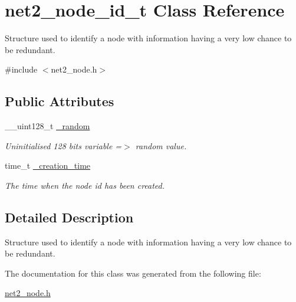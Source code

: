 \hypertarget{structnet2__node__id__t}{\section{net2\-\_\-node\-\_\-id\-\_\-t Class Reference}
\label{structnet2__node__id__t}
}


Structure used to identify a node with information having a very low chance to be redundant.  




{\ttfamily \#include $<$net2\-\_\-node.\-h$>$}

\subsection*{Public Attributes}
\begin{DoxyCompactItemize}
\item 
\hypertarget{structnet2__node__id__t_a6e460574e643faf521faa7fccba55b23}{\-\_\-\-\_\-uint128\-\_\-t \hyperlink{structnet2__node__id__t_a6e460574e643faf521faa7fccba55b23}{\-\_\-random}}\label{structnet2__node__id__t_a6e460574e643faf521faa7fccba55b23}

\begin{DoxyCompactList}\small\item\em Uninitialised 128 bits variable =$>$ random value. \end{DoxyCompactList}\item 
\hypertarget{structnet2__node__id__t_a63b7fd0ffb02499f9bff9b8755952e2b}{time\-\_\-t \hyperlink{structnet2__node__id__t_a63b7fd0ffb02499f9bff9b8755952e2b}{\-\_\-creation\-\_\-time}}\label{structnet2__node__id__t_a63b7fd0ffb02499f9bff9b8755952e2b}

\begin{DoxyCompactList}\small\item\em The time when the node id has been created. \end{DoxyCompactList}\end{DoxyCompactItemize}


\subsection{Detailed Description}
Structure used to identify a node with information having a very low chance to be redundant. 

The documentation for this class was generated from the following file\-:\begin{DoxyCompactItemize}
\item 
\hyperlink{net2__node_8h}{net2\-\_\-node.\-h}\end{DoxyCompactItemize}
